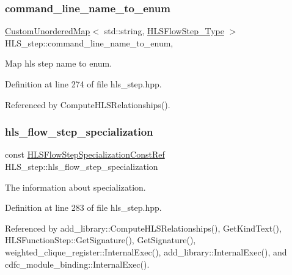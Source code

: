 \subsubsection{\texorpdfstring{command\+\_\+line\+\_\+name\+\_\+to\+\_\+enum}{command\_line\_name\_to\_enum}}
{\footnotesize\ttfamily \hyperlink{custom__map_8hpp_ad1ed68f2ff093683ab1a33522b144adc}{Custom\+Unordered\+Map}$<$ std\+::string, \hyperlink{hls__step_8hpp_ada16bc22905016180e26fc7e39537f8d}{H\+L\+S\+Flow\+Step\+\_\+\+Type} $>$ H\+L\+S\+\_\+step\+::command\+\_\+line\+\_\+name\+\_\+to\+\_\+enum\hspace{0.3cm}{\ttfamily [static]}, {\ttfamily [protected]}}



Map hls step name to enum. 



Definition at line 274 of file hls\+\_\+step.\+hpp.



Referenced by Compute\+H\+L\+S\+Relationships().

\mbox{\label{classHLS__step_a843be75ba53b81876aa3c8b870ae8a55}} 
\subsubsection{\texorpdfstring{hls\+\_\+flow\+\_\+step\+\_\+specialization}{hls\_flow\_step\_specialization}}
{\footnotesize\ttfamily const \hyperlink{hls__step_8hpp_a5fdd2edf290c196531d21d68e13f0e74}{H\+L\+S\+Flow\+Step\+Specialization\+Const\+Ref} H\+L\+S\+\_\+step\+::hls\+\_\+flow\+\_\+step\+\_\+specialization\hspace{0.3cm}{\ttfamily [protected]}}



The information about specialization. 



Definition at line 283 of file hls\+\_\+step.\+hpp.



Referenced by add\+\_\+library\+::\+Compute\+H\+L\+S\+Relationships(), Get\+Kind\+Text(), H\+L\+S\+Function\+Step\+::\+Get\+Signature(), Get\+Signature(), weighted\+\_\+clique\+\_\+register\+::\+Internal\+Exec(), add\+\_\+library\+::\+Internal\+Exec(), and cdfc\+\_\+module\+\_\+binding\+::\+Internal\+Exec().

